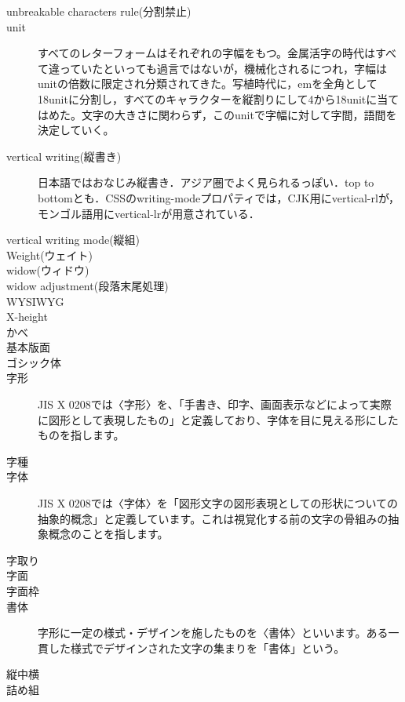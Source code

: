 \begin{description}
    \item[unbreakable characters rule(分割禁止)]
    \item[unit]すべてのレターフォームはそれぞれの字幅をもつ。金属活字の時代はすべて違っていたといっても過言ではないが，機械化されるにつれ，字幅はunitの倍数に限定され分類されてきた。写植時代に，emを全角として18unitに分割し，すべてのキャラクターを縦割りにして4から18unitに当てはめた。文字の大きさに関わらず，このunitで字幅に対して字間，語間を決定していく\cite{handbook_of_typography}。
    \item[vertical writing(縦書き)] 日本語ではおなじみ縦書き．アジア圏でよく見られるっぽい．top to bottomとも\cite{eikaiwa.dmm.com:uknow/questions/29852/}\cite{www.w3.org:International/questions/qa-scripts}．CSSの{\sf writing-mode}プロパティでは，CJK用に{\sf vertical-rl}が，モンゴル語用に{\sf vertical-lr}が用意されている\cite{www.w3.org:International/articles/vertical-text/}．
    \item[vertical writing mode(縦組)]
    \item[Weight(ウェイト)]
    \item[widow(ウィドウ)]
    \item[widow adjustment(段落末尾処理)]
    \item[WYSIWYG]
    \item[X-height]
    \item[かべ]
    \item[基本版面]
    \item[ゴシック体]
    \item[字形]JIS X 0208では〈字形〉を、「手書き、印字、画面表示などによって実際に図形として表現したもの」と定義しており、字体を目に見える形にしたものを指します\cite{introduction_to_japanese_typesetting}。
    \item[字種]
    \item[字体]JIS X 0208では〈字体〉を「図形文字の図形表現としての形状についての抽象的概念」と定義しています。これは視覚化する前の文字の骨組みの抽象概念のことを指します\cite{introduction_to_japanese_typesetting}。
    \item[字取り]
    \item[字面]
    \item[字面枠]
    \item[書体]字形に一定の様式・デザインを施したものを〈書体〉といいます\cite{introduction_to_japanese_typesetting}。ある一貫した様式でデザインされた文字の集まりを「書体」という\cite{mdn_201507}。
    \item[縦中横]
    \item[詰め組]

\end{description}
